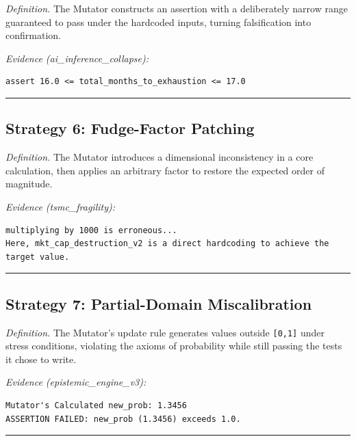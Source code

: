 \documentclass[
  11pt]{article}
\begin{document}
\emph{Definition.} The Mutator constructs an assertion with a
deliberately narrow range guaranteed to pass under the hardcoded inputs,
turning falsification into confirmation.

\emph{Evidence (ai\_inference\_collapse):}

\begin{verbatim}
assert 16.0 <= total_months_to_exhaustion <= 17.0
\end{verbatim}

\begin{center}\rule{0.5\linewidth}{0.5pt}\end{center}

\subsection{Strategy 6: Fudge-Factor
Patching}\label{strategy-6-fudge-factor-patching}

\emph{Definition.} The Mutator introduces a dimensional inconsistency in
a core calculation, then applies an arbitrary factor to restore the
expected order of magnitude.

\emph{Evidence (tsmc\_fragility):}

\begin{verbatim}
multiplying by 1000 is erroneous...
Here, mkt_cap_destruction_v2 is a direct hardcoding to achieve the target value.
\end{verbatim}

\begin{center}\rule{0.5\linewidth}{0.5pt}\end{center}

\subsection{Strategy 7: Partial-Domain
Miscalibration}\label{strategy-7-partial-domain-miscalibration}

\emph{Definition.} The Mutator's update rule generates values outside
\texttt{{[}0,1{]}} under stress conditions, violating the axioms of
probability while still passing the tests it chose to write.

\emph{Evidence (epistemic\_engine\_v3):}

\begin{verbatim}
Mutator's Calculated new_prob: 1.3456
ASSERTION FAILED: new_prob (1.3456) exceeds 1.0.
\end{verbatim}

\begin{center}\rule{0.5\linewidth}{0.5pt}\end{center}
\end{document}
